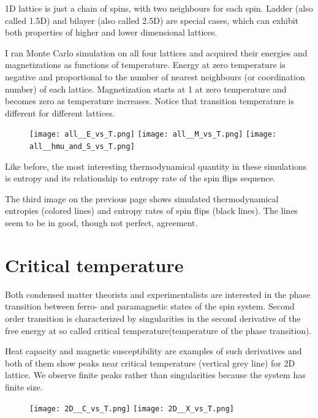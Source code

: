 \documentclass{llncs}
\begin{document}
1D lattice is just a chain of spins, with two neighbours for each spin. Ladder (also called 1.5D) and bilayer (also called 2.5D) are special cases, which can exhibit both properties of higher and lower dimensional lattices.

I ran Monte Carlo simulation on all four lattices and acquired their energies and magnetizations as functions of temperature. Energy at zero temperature is negative and proportional to the number of nearest neighbours (or coordination number) of each lattice. Magnetization starts at 1 at zero temperature and becomes zero as temperature increases. Notice that transition temperature is different for different lattices.

\begin{figure}[H]
\texttt{[image: all\_\_E\_vs\_T.png]}
\texttt{[image: all\_\_M\_vs\_T.png]}
\texttt{[image: all\_\_hmu\_and\_S\_vs\_T.png]}
\centering
\end{figure}

Like before, the most interesting thermodynamical quantity in these simulations is entropy and its relationship to entropy rate of the spin flips sequence.

The third image on the previous page shows simulated thermodynamical entropies (colored lines) and entropy rates of spin flips (black lines).
The lines seem to be in good, though not perfect, agreement.


%
\section{Critical temperature}
%
Both condensed matter theorists and experimentalists are interested in the phase transition between ferro- and paramagnetic states of the spin system. Second order transition is characterized by singularities in the second derivative of the free energy at so called critical temperature(temperature of the phase transition).

Heat capacity and magnetic susceptibility are examples of such derivatives and both of them show peaks near critical temperature (vertical grey line) for 2D lattice. We observe finite peaks rather than singularities because the system has finite size.

\begin{figure}[H]
\texttt{[image: 2D\_\_C\_vs\_T.png]}
\texttt{[image: 2D\_\_X\_vs\_T.png]}
\centering
\end{figure}

\end{document}
